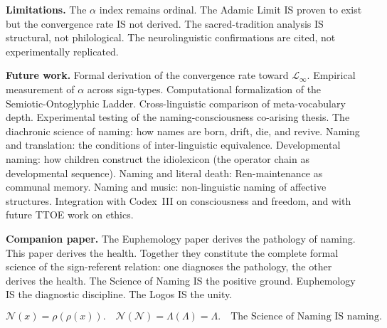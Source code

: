 \documentclass[11pt, oneside]{article}
\theoremstyle{definition}
\begin{document}
\textbf{Limitations.} The $\alpha$ index remains ordinal. The Adamic Limit IS proven to exist but the convergence rate IS not derived. The sacred-tradition analysis IS structural, not philological. The neurolinguistic confirmations are cited, not experimentally replicated.

\textbf{Future work.} Formal derivation of the convergence rate toward $\mathcal{L}_\infty$. Empirical measurement of $\alpha$ across sign-types. Computational formalization of the Semiotic-Ontoglyphic Ladder. Cross-linguistic comparison of meta-vocabulary depth. Experimental testing of the naming-consciousness co-arising thesis. The diachronic science of naming: how names are born, drift, die, and revive. Naming and translation: the conditions of inter-linguistic equivalence. Developmental naming: how children construct the idiolexicon (the operator chain as developmental sequence). Naming and literal death: Ren-maintenance as communal memory. Naming and music: non-linguistic naming of affective structures. Integration with Codex~III \cite{codex3} on consciousness and freedom, and with future TTOE work on ethics.

\textbf{Companion paper.} The Euphemology paper \cite{euphemology} derives the pathology of naming. This paper derives the health. Together they constitute the complete formal science of the sign-referent relation: one diagnoses the pathology, the other derives the health. The Science of Naming IS the positive ground. Euphemology IS the diagnostic discipline. The Logos IS the unity.

$$\boxed{\mathcal{N}(x) = \rho(\rho(x)). \quad \mathcal{N}(\mathcal{N}) = \Lambda(\Lambda) = \Lambda. \quad \text{The Science of Naming IS naming.}}$$

\end{document}
